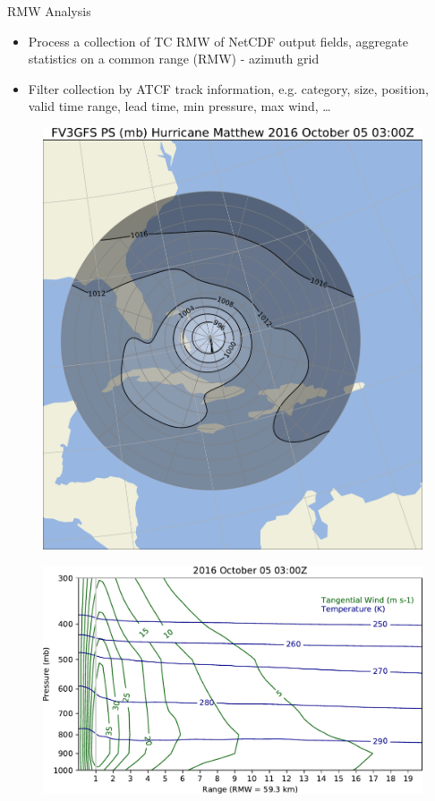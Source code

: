 \documentclass[final]{beamer}
\newlength{\onecolwid}
\newlength{\twocolwid}
\begin{document}
\begin{frame}[containsverbatim]
\begin{columns}[t]
\begin{column}{\twocolwid}
\begin{columns}[t,totalwidth=\twocolwid]
\begin{column}{\onecolwid}
\begin{block}{RMW Analysis}
\begin{itemize}
\item Process a collection of TC RMW of NetCDF output fields,
aggregate statistics on a common range (RMW) - azimuth grid
\item Filter collection by ATCF track information, e.g. category, size,
position, valid time range, lead time, min pressure, max wind, \ldots
\end{itemize}
\vspace{1in}
\begin{figure}
\includegraphics[width=1.0\linewidth]{../plots/PRMSL_2016100503.pdf}
\end{figure}
\begin{figure}
\includegraphics[width=1.0\linewidth]{../plots/cross_section_2016100503.pdf}
\end{figure}


\end{block}
\end{column}
\end{columns}
\end{column}
\end{columns}
\end{frame}
\end{document}
